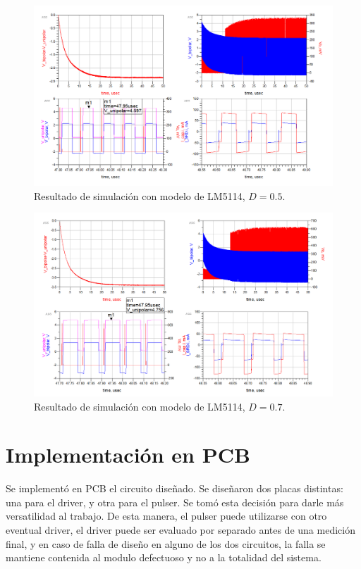 \begin{figure}[tbp]
    \centering
    \includegraphics[width=\textwidth]{images/lm5114_sim_result_50_D.png}
    \caption{Resultado de simulación con modelo de LM5114, $D=0.5$.}
    \label{fig:lm5114_sim_result_50_D}
\end{figure}

\begin{figure}[tbp]
    \centering
    \includegraphics[width=\textwidth]{images/lm5114_sim_result_70_D.png}
    \caption{Resultado de simulación con modelo de LM5114, $D=0.7$.}
    \label{fig:lm5114_sim_result_70_D}
\end{figure}

\section{Implementación en PCB}

Se implementó en PCB el circuito diseñado. Se diseñaron dos placas distintas:
una para el driver, y otra para el pulser. Se tomó esta decisión para darle más
versatilidad al trabajo. De esta manera, el pulser puede utilizarse con otro
eventual driver, el driver puede ser evaluado por separado antes de una medición
final, y en caso de falla de diseño en alguno de los dos circuitos, la falla se
mantiene contenida al modulo defectuoso y no a la totalidad del sistema.

